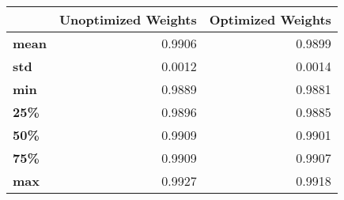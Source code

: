 \begin{tabular}{lrr}
\toprule
{} &  Unoptimized Weights &  Optimized Weights \\
\midrule
\textbf{mean} &               0.9906 &             0.9899 \\
\textbf{std } &               0.0012 &             0.0014 \\
\textbf{min } &               0.9889 &             0.9881 \\
\textbf{25\% } &               0.9896 &             0.9885 \\
\textbf{50\% } &               0.9909 &             0.9901 \\
\textbf{75\% } &               0.9909 &             0.9907 \\
\textbf{max } &               0.9927 &             0.9918 \\
\bottomrule
\end{tabular}
